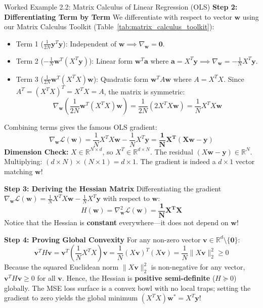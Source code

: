 \begin{examplebox}[breakable]{Worked Example 2.2: Matrix Calculus of Linear Regression (OLS)}
\textbf{Step 2: Differentiating Term by Term}
We differentiate with respect to vector $\mathbf{w}$ using our Matrix Calculus Toolkit (Table~\ref{tab:matrix_calculus_toolkit}):
\begin{itemize}
    \item Term 1 ($\frac{1}{2N}\mathbf{y}^T \mathbf{y}$): Independent of $\mathbf{w} \implies \nabla_{\mathbf{w}} = \mathbf{0}$.
    \item Term 2 ($-\frac{1}{N}\mathbf{w}^T (X^T \mathbf{y})$): Linear form $\mathbf{w}^T \mathbf{a}$ where $\mathbf{a} = X^T \mathbf{y} \implies \nabla_{\mathbf{w}} = -\frac{1}{N} X^T \mathbf{y}$.
    \item Term 3 ($\frac{1}{2N}\mathbf{w}^T (X^T X)\mathbf{w}$): Quadratic form $\mathbf{w}^T A \mathbf{w}$ where $A = X^T X$. Since $A^T = (X^T X)^T = X^T X = A$, the matrix is symmetric:
    \begin{equation*}
    \nabla_{\mathbf{w}} \left( \frac{1}{2N} \mathbf{w}^T (X^T X)\mathbf{w} \right) = \frac{1}{2N} (2 X^T X \mathbf{w}) = \frac{1}{N} X^T X \mathbf{w}
    \end{equation*}
\end{itemize}
Combining terms gives the famous OLS gradient:
\begin{equation*}
\nabla_{\mathbf{w}} \mathcal{L}(\mathbf{w}) = \frac{1}{N} X^T X \mathbf{w} - \frac{1}{N} X^T \mathbf{y} = \mathbf{\frac{1}{N} X^T (X\mathbf{w} - \mathbf{y})}
\end{equation*}
\textbf{Dimension Check:} $X \in \mathbb{R}^{N \times d}$, so $X^T \in \mathbb{R}^{d \times N}$. The residual $(X\mathbf{w} - \mathbf{y}) \in \mathbb{R}^N$.
Multiplying: $(d \times N) \times (N \times 1) = d \times 1$. The gradient is indeed a $d \times 1$ vector matching $\mathbf{w}$!

\textbf{Step 3: Deriving the Hessian Matrix}
Differentiating the gradient $\nabla_{\mathbf{w}} \mathcal{L}(\mathbf{w}) = \frac{1}{N}X^T X\mathbf{w} - \frac{1}{N}X^T \mathbf{y}$ with respect to $\mathbf{w}$:
\begin{equation*}
H(\mathbf{w}) = \nabla^2_{\mathbf{w}} \mathcal{L}(\mathbf{w}) = \mathbf{\frac{1}{N} X^T X}
\end{equation*}
Notice that the Hessian is \textbf{constant} everywhere—it does not depend on $\mathbf{w}$!

\textbf{Step 4: Proving Global Convexity}
For any non-zero vector $\mathbf{v} \in \mathbb{R}^d \setminus \{\mathbf{0}\}$:
\begin{equation*}
\mathbf{v}^T H \mathbf{v} = \mathbf{v}^T \left( \frac{1}{N} X^T X \right) \mathbf{v} = \frac{1}{N} (X\mathbf{v})^T (X\mathbf{v}) = \frac{1}{N} \|X\mathbf{v}\|_2^2 \ge 0
\end{equation*}
Because the squared Euclidean norm $\|X\mathbf{v}\|_2^2$ is non-negative for any vector, $\mathbf{v}^T H \mathbf{v} \ge 0$ for all $\mathbf{v}$.
Hence, the Hessian is \textbf{positive semi-definite} ($H \succeq 0$) globally. The MSE loss surface is a convex bowl with no local traps; setting the gradient to zero yields the global minimum $(X^T X)\mathbf{w}^* = X^T \mathbf{y}$!
\end{examplebox}

